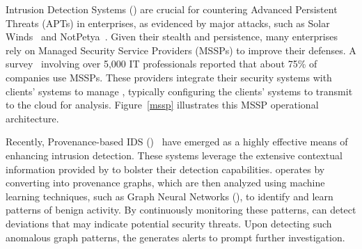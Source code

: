 





Intrusion Detection Systems (\ids) are crucial for countering Advanced Persistent Threats (APTs) in enterprises, as evidenced by major attacks, such as Solar Winds~\cite{solarwinds} and NotPetya~\cite{notpetya}. Given their stealth and persistence, many enterprises rely on Managed Security Service Providers (MSSPs) to improve their defenses. A survey~\cite{msspsurvey} involving over 5,000 IT professionals reported that about 75\% of companies use MSSPs. These providers integrate their security systems with clients' systems to manage \logs, typically configuring the clients' systems to transmit \logs to the cloud for analysis. Figure~\ref{mssp} illustrates this MSSP operational architecture.



Recently, Provenance-based IDS (\pids)~\cite{streamspot,provdetector2020,wang2022threatrace,shadewatcher,yangprographer,han2020unicorn,jia2023magic,flash2024,cheng2023kairos,sigl} have emerged as a highly effective means of enhancing intrusion detection. These systems leverage the extensive contextual information provided by \logs to bolster their detection capabilities. \pids operates by converting \logs into provenance graphs, which are then analyzed using machine learning techniques, such as Graph Neural Networks (\gnnshort), to identify and learn patterns of benign activity. By continuously monitoring these patterns, \pids can detect deviations that may indicate potential security threats. Upon detecting such anomalous graph patterns, the \pids generates alerts to prompt further investigation.

